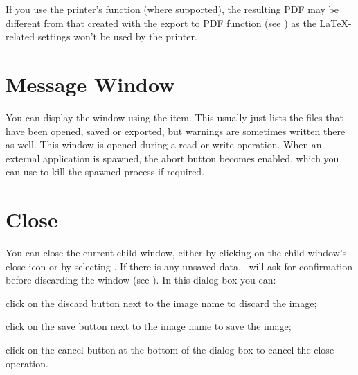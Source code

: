 \begin{information}
If you use the printer's  function (where
supported), the resulting PDF may be different from that created
with the export to PDF function (see )
as the \LaTeX-related settings won't be used by the printer.
\end{information}

\section{Message Window}\label{sec:messages}


You can display the  window using the
 item. This usually just lists the
files that have been opened, saved or exported, but warnings are
sometimes written there as well. This window is opened during a read
or write operation. When an external application is spawned, the
abort button becomes enabled, which you can use to kill the spawned
process if required.

\section{Close}\label{sec:closeimage}


You can close the current child window, either by clicking on the
child window's close icon or by selecting .
If there is any unsaved data, \FlowframTk\ will ask for confirmation
before discarding the window (see ).
In this dialog box you can:

\begin{deflist}

\begin{itemdesc}
click on the discard button next to the image name to discard the
image;
\end{itemdesc}


\begin{itemdesc}
click on the save button next to the image name to save the image;
\end{itemdesc}


\begin{itemdesc}
click on the cancel button at the bottom of the dialog box to cancel
the close operation.
\end{itemdesc}

\end{deflist}

